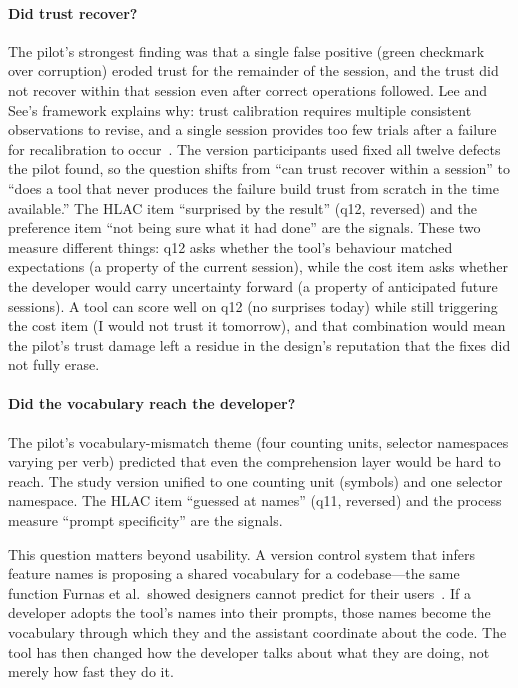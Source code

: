 \paragraph{Did trust recover?}
The pilot's strongest finding was that a single false positive (green checkmark
over corruption) eroded trust for the remainder of the session, and the trust
did not recover within that session even after correct operations followed. Lee
and See's framework explains why: trust calibration requires multiple consistent
observations to revise, and a single session provides too few trials after a
failure for recalibration to occur~\cite{lee2004}. The version participants used
fixed all twelve defects the pilot found, so the question shifts from ``can
trust recover within a session'' to ``does a tool that never produces the
failure build trust from scratch in the time available.'' The HLAC item
``surprised by the result'' (q12, reversed) and the preference item ``not being
sure what it had done'' are the signals. These two measure different things: q12
asks whether the tool's behaviour matched expectations (a property of the
current session), while the cost item asks whether the developer would carry
uncertainty forward (a property of anticipated future sessions). A tool can
score well on q12 (no surprises today) while still triggering the cost item
(I would not trust it tomorrow), and that combination would mean the pilot's
trust damage left a residue in the design's reputation that the fixes did not
fully erase.

\paragraph{Did the vocabulary reach the developer?}
The pilot's vocabulary-mismatch theme (four counting units, selector namespaces
varying per verb) predicted that even the comprehension layer would be hard to
reach. The study version unified to one counting unit (symbols) and one
selector namespace. The HLAC item ``guessed at names'' (q11, reversed) and the
process measure ``prompt specificity'' are the signals.

This question matters beyond usability. A version control system that infers
feature names is proposing a shared vocabulary for a codebase---the same
function Furnas et al.\ showed designers cannot predict for their
users~\cite{furnas1987}. If a developer adopts the tool's names into their
prompts, those names become the vocabulary through which they and the assistant
coordinate about the code. The tool has then changed how the developer talks
about what they are doing, not merely how fast they do it.


